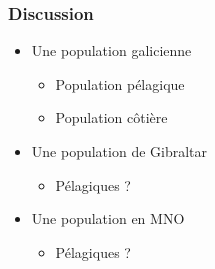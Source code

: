 \documentclass[10pt,xcolor=table]{beamer}\usepackage[]{graphicx}\usepackage[]{color}
\begin{document}
\begin{frame}
\frametitle{Discussion}
\begin{itemize}
		\item Une population galicienne
			\begin{itemize}
				\item Population pélagique \citep{louis2014}
				\item Population côtière \citep{louis2014} 
			\end{itemize}
	\item Une population de Gibraltar 
	\begin{itemize}
		\item Pélagiques ? \citep{lowther2014}
	\end{itemize}
	\item Une population en MNO
	\begin{itemize}
		\item Pélagiques ? \citep{lowther2014}
	\end{itemize}
\end{itemize}
\end{frame}
\end{document}
